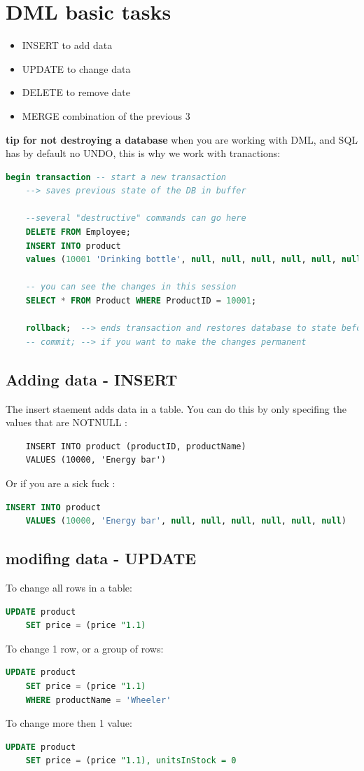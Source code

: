 \documentclass{report}
\begin{document}
	\section{DML basic tasks}
	\begin{itemize}
		\item INSERT to add data
		\item UPDATE to change data
		\item DELETE to remove date
		\item MERGE combination of the previous 3
	\end{itemize}
	
	\textbf{tip for not destroying a database}
	when you are working with DML, and SQL has by default no UNDO, this is why we work with tranactions: 
	\begin{lstlisting}[language=SQL]
	begin transaction -- start a new transaction
	--> saves previous state of the DB in buffer
	
	--several "destructive" commands can go here
	DELETE FROM Employee;
	INSERT INTO product
	values (10001 'Drinking bottle', null, null, null, null, null, null);
	
	-- you can see the changes in this session
	SELECT * FROM Product WHERE ProductID = 10001;
	
	rollback;  --> ends transaction and restores database to state before begin transaction
	-- commit; --> if you want to make the changes permanent\end{lstlisting}
	\subsection{Adding data - INSERT}
	The insert staement adds data in a table. You can do this by only specifing the values that are NOTNULL : 
	\begin{lstlisting}
	INSERT INTO product (productID, productName)
	VALUES (10000, 'Energy bar')\end{lstlisting}
	Or if you are a sick fuck : 
	\begin{lstlisting}[language=SQL]
	INSERT INTO product
	VALUES (10000, 'Energy bar', null, null, null, null, null, null)\end{lstlisting}
	\subsection{modifing data - UPDATE}
	To change all rows in a table: 
	\begin{lstlisting}[language=SQL]
	UPDATE product
	SET price = (price "1.1)\end{lstlisting}
	To change 1 row, or a group of rows:  
	\begin{lstlisting}[language=SQL]
	UPDATE product
	SET price = (price "1.1)
	WHERE productName = 'Wheeler'\end{lstlisting}
	To change more then 1 value: 
	\begin{lstlisting}[language=SQL]
	UPDATE product
	SET price = (price "1.1), unitsInStock = 0\end{lstlisting}
\end{document}
